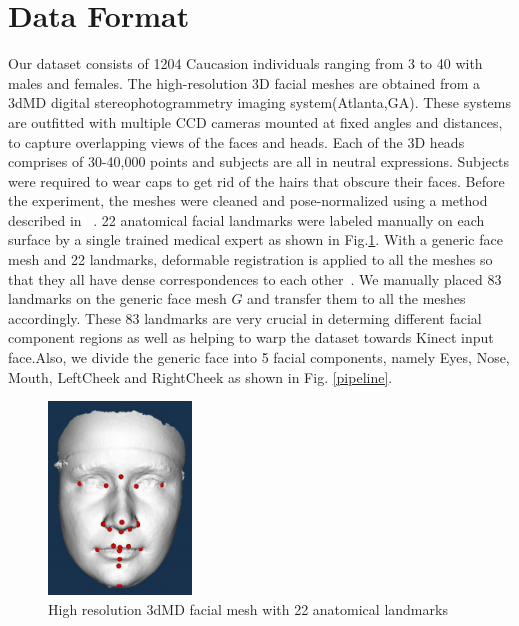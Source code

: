 \documentclass[annual]{acmsiggraph}
\begin{document}
\section{Data Format}

Our dataset consists of 1204 Caucasion individuals ranging from 3 to 40 with males and females. The high-resolution 3D facial meshes are obtained from a 3dMD digital stereophotogrammetry imaging system(Atlanta,GA). These systems are outfitted with multiple CCD cameras mounted at fixed angles and distances, to capture overlapping views of the faces and heads. Each of the 3D heads comprises of 30-40,000 points and subjects are all in neutral expressions. Subjects were required to wear caps to get rid of the hairs that obscure their faces. Before the experiment, the meshes were cleaned and pose-normalized using a method described in ~\cite{jia'swork}. 22 anatomical facial landmarks were labeled manually on each surface by a single trained medical expert as shown in Fig.\ref{dataset}. With a generic face mesh and 22 landmarks, deformable registration is applied to all the meshes so that they all have dense correspondences to each other~\cite{allen}. We manually placed 83 landmarks on the generic face mesh $G$ and transfer them to all the meshes accordingly.  These 83 landmarks are very crucial in determing different facial component regions as well as helping to warp the dataset towards Kinect input face.Also, we divide the generic face into 5 facial components, namely Eyes, Nose, Mouth, LeftCheek and RightCheek as shown in Fig. \ref{pipeline}. 

\begin{figure}[ht]
  \centering
  \includegraphics[width=1.5in]{images/dataformat}
  \caption{High resolution 3dMD facial mesh with 22 anatomical landmarks}\label{dataset}
\end{figure}
\end{document}
